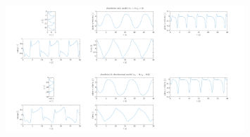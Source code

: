\documentclass[draft]{jfm} %
\begin{document}
\begin{figure}
    \centering
    \includegraphics[angle=90,width=0.8\textwidth]{pics/g338.png}
    \label{fig:t_r_diagram_1}
\end{figure}

\textbf{}





\end{document}
